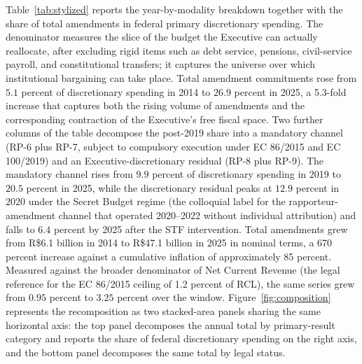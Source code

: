 \documentclass[pdflatex,sn-basic]{sn-jnl}
\begin{document}
Table~\ref{tab:stylized} reports the year-by-modality breakdown together with the share of total amendments in federal primary discretionary spending. The denominator measures the slice of the budget the Executive can actually reallocate, after excluding rigid items such as debt service, pensions, civil-service payroll, and constitutional transfers; it captures the universe over which institutional bargaining can take place. Total amendment commitments rose from $5.1$ percent of discretionary spending in 2014 to $26.9$ percent in 2025, a 5.3-fold increase that captures both the rising volume of amendments and the corresponding contraction of the Executive's free fiscal space. Two further columns of the table decompose the post-2019 share into a mandatory channel (RP-6 plus RP-7, subject to compulsory execution under EC 86/2015 and EC 100/2019) and an Executive-discretionary residual (RP-8 plus RP-9). The mandatory channel rises from $9.9$ percent of discretionary spending in 2019 to $20.5$ percent in 2025, while the discretionary residual peaks at $12.9$ percent in 2020 under the Secret Budget regime (the colloquial label for the rapporteur-amendment channel that operated 2020--2022 without individual attribution) and falls to $6.4$ percent by 2025 after the STF intervention. Total amendments grew from R\$6.1 billion in 2014 to R\$47.1 billion in 2025 in nominal terms, a 670 percent increase against a cumulative inflation of approximately 85 percent. Measured against the broader denominator of Net Current Revenue (the legal reference for the EC 86/2015 ceiling of 1.2 percent of RCL), the same series grew from $0.95$ percent to $3.25$ percent over the window. Figure~\ref{fig:composition} represents the recomposition as two stacked-area panels sharing the same horizontal axis: the top panel decomposes the annual total by primary-result category and reports the share of federal discretionary spending on the right axis, and the bottom panel decomposes the same total by legal status.
\end{document}
